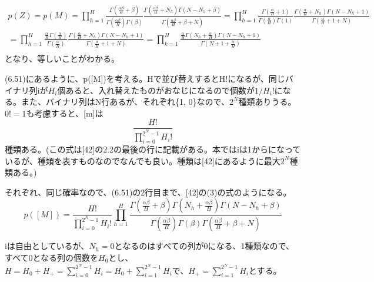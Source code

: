 ﻿\documentclass{jsarticle}
\begin{document}
\begin{equation}
\begin{split}
p(Z) = p(M) = \prod_{h=1}^H \frac{\Gamma(\frac{\alpha\beta}{H} + \beta)}{\Gamma(\frac{\alpha\beta}{H})\Gamma(\beta)}\frac{\Gamma(\frac{\alpha\beta}{H} + N_h)\Gamma(N - N_h + \beta)}{\Gamma(\frac{\alpha\beta}{H} + \beta + N)}
= \prod_{h=1}^H \frac{\Gamma(\frac{\alpha}{H} + 1)}{\Gamma(\frac{\alpha}{H})\Gamma(1)}\frac{\Gamma(\frac{\alpha}{H} + N_h)\Gamma(N - N_h + 1)}{\Gamma(\frac{\alpha}{H} + 1 + N)}\\
= \prod_{h=1}^H \frac{\frac{\alpha}{H}\Gamma(\frac{\alpha}{H})}{\Gamma(\frac{\alpha}{H})}\frac{\Gamma(\frac{\alpha}{H} + N_h)\Gamma(N - N_h + 1)}{\Gamma(\frac{\alpha}{H} + 1 + N)}
= \prod_{k=1}^H \frac{\frac{\alpha}{H}\Gamma(N_h + \frac{\alpha}{H})\Gamma(N - N_h + 1)}{\Gamma(N + 1 + \frac{\alpha}{H})}\\
\end{split}
\end{equation}
となり、等しいことがわかる。

(6.51)にあるように、p([M])を考える。Hで並び替えするとH!になるが、同じバイナリ列iが$H_i$個あると、入れ替えたものがおなじになるので個数が$1 / H_i!$になる。また、バイナリ列はN行あるが、それぞれ\{1, 0\}なので、$2^N$種類ありうる。$0! = 1$も考慮すると、[m]は
\begin{equation}
\frac{H!}{\prod_{i=0}^{2^N - 1}H_i!}
\end{equation}
種類ある。(この式は[42]の2.2の最後の行に記載がある。本ではiは1からになっているが、種類を表すものなのでなんでも良い。種類は[42]にあるように最大$2^N$種類ある。)

それぞれ、同じ確率なので、(6.51)の2行目まで、[42]の(3)の式のようになる。
\begin{equation}
p([M]) = \frac{H!}{\prod_{i=0}^{2^N - 1}H_i!} \prod_{h=1}^H \frac{\Gamma(\frac{\alpha\beta}{H} + \beta)\Gamma(N_h + \frac{\alpha\beta}{H})\Gamma(N - N_h + \beta)}{\Gamma(\frac{\alpha\beta}{H})\Gamma(\beta)\Gamma(\frac{\alpha\beta}{H} + \beta + N)}
\end{equation}

iは自由としているが、$N_h = 0$となるのはすべての列が0になる、1種類なので、すべて0となる列の個数を$H_0$とし、
$H = H_0 + H_+ = \sum_{i=0}^{2^N - 1} H_i = H_0 + \sum_{i=1}^{2^N - 1} H_i$で、$H_+ = \sum_{i=1}^{2^N - 1} H_i$とする。
\end{document}
